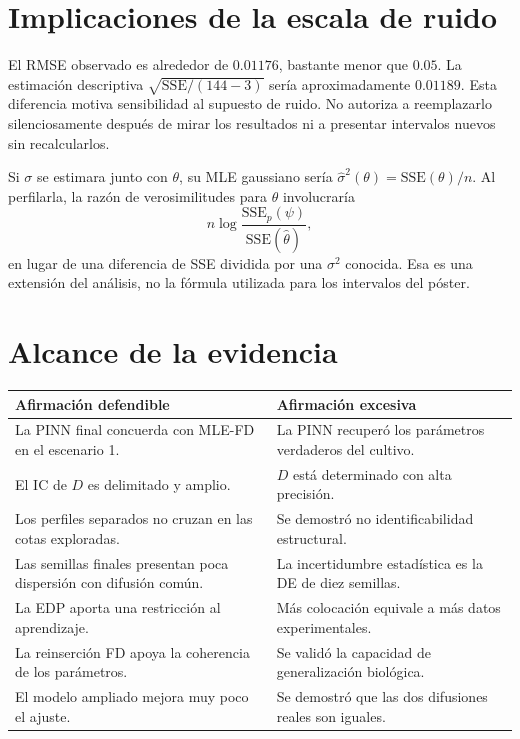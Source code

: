 \documentclass[11pt,a4paper]{report}
\begin{document}
\section{Implicaciones de la escala de ruido}
El RMSE observado es alrededor de $0.01176$, bastante menor que $0.05$. La estimación descriptiva $\sqrt{\mathrm{SSE}/(144-3)}$ sería aproximadamente $0.01189$. Esta diferencia motiva sensibilidad al supuesto de ruido. No autoriza a reemplazarlo silenciosamente después de mirar los resultados ni a presentar intervalos nuevos sin recalcularlos.

Si $\sigma$ se estimara junto con $\theta$, su MLE gaussiano sería $\widehat\sigma^2(\theta)=\mathrm{SSE}(\theta)/n$. Al perfilarla, la razón de verosimilitudes para $\theta$ involucraría
\[
n\log\frac{\mathrm{SSE}_p(\psi)}{\mathrm{SSE}(\widehat\theta)},
\]
en lugar de una diferencia de SSE dividida por una $\sigma^2$ conocida. Esa es una extensión del análisis, no la fórmula utilizada para los intervalos del póster.

\section{Alcance de la evidencia}
\begin{longtable}{p{}p{}}
\toprule Afirmación defendible & Afirmación excesiva\\\midrule
La PINN final concuerda con MLE-FD en el escenario 1. & La PINN recuperó los parámetros verdaderos del cultivo.\\
El IC de $D$ es delimitado y amplio. & $D$ está determinado con alta precisión.\\
Los perfiles separados no cruzan en las cotas exploradas. & Se demostró no identificabilidad estructural.\\
Las semillas finales presentan poca dispersión con difusión común. & La incertidumbre estadística es la DE de diez semillas.\\
La EDP aporta una restricción al aprendizaje. & Más colocación equivale a más datos experimentales.\\
La reinserción FD apoya la coherencia de los parámetros. & Se validó la capacidad de generalización biológica.\\
El modelo ampliado mejora muy poco el ajuste. & Se demostró que las dos difusiones reales son iguales.\\\bottomrule
\end{longtable}
\end{document}
